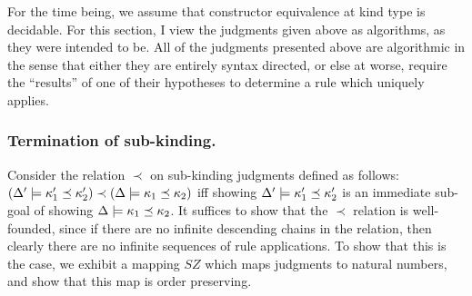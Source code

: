 \documentclass[12pt,twoside,fleqn]{amsart}
\theoremstyle{plain}
\theoremstyle{plain}
\theoremstyle{definition}
\begin{document}
\newcommand{\Kmeas}[1]{SZ_{\kappa }(#1 )}

\newcommand{\Ameas}[1]{SZ_{\Downarrow }(#1 )}
 
\newcommand{\Smeas}[1]{SZ_{\Uparrow }(#1 )}

\newcommand{\kmeas}[2]{\Kmeas{\kindvalid{#1 }{#2 }}}

\newcommand{\ameas}[3]{\Ameas{\kcheck{#1 }{#2 }{#3 }}}

\newcommand{\smeas}[3]{\Smeas{\kindsynth{#1 }{#2 }{#3 }}}


For the time being, we assume that constructor equivalence at kind type is decidable.
For this section, I view the judgments given above as algorithms, as they were
intended to be. All of the judgments presented above are algorithmic in the
sense that either they are entirely syntax directed, or else at worse, require
the ``results'' of one of their hypotheses to determine a rule which uniquely
applies.


\subsubsection{Termination of sub-kinding.}

Consider the relation \( \prec  \) on sub-kinding judgments defined as follows:
\( (\Delta ' \models \kappa _{1}' \preceq \kappa _{2}')\prec (\Delta  \models \kappa _{1} \preceq \kappa _{2}) \)
iff showing \( \Delta ' \models \kappa _{1}' \preceq \kappa _{2}' \) is an immediate
sub-goal of showing \( \Delta  \models \kappa _{1} \preceq \kappa _{2} \). It
suffices to show that the \( \prec  \) relation is well-founded, since if there
are no infinite descending chains in the relation, then clearly there are no
infinite sequences of rule applications. To show that this is the case, we exhibit
a mapping \( SZ \) which maps judgments to natural numbers, and show that this
map is order preserving. 
\end{document}
